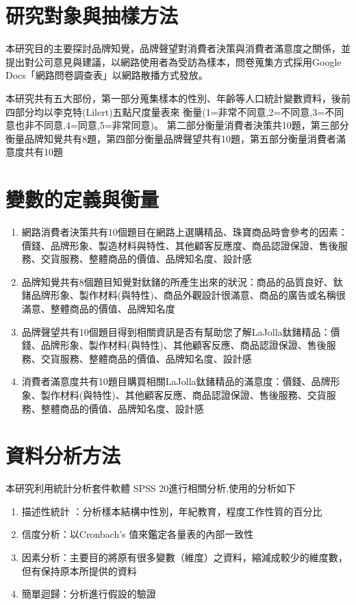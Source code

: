 \section{研究對象與抽樣方法}
本研究目的主要探討品牌知覺，品牌聲望對消費者決策與消費者滿意度之關係，並提出對公司意見與建議，以網路使用者為受訪為樣本，問卷蒐集方式採用Google Docs「網路問卷調查表」以網路散播方式發放。

本研究共有五大部份，第一部分蒐集樣本的性別、年齡等人口統計變數資料，後前四部分均以李克特(Lilert)五點尺度量表來 衡量(1=非常不同意,2=不同意,3=不同意也非不同意,4=同意,5=非常同意)。
第二部分衡量消費者決策共10題，第三部分衡量品牌知覺共有8題，第四部分衡量品牌聲望共有10題，第五部分衡量消費者滿意度共有10題

\section{變數的定義與衡量}
\begin{enumerate}
\item  網路消費者決策共有10個題目在網路上選購精品、珠寶商品時會參考的因素：價錢、品牌形象、製造材料與特性、其他顧客反應度、商品認證保證、售後服務、交貨服務、整體商品的價值、品牌知名度、設計感
\item 品牌知覺共有8個題目知覺對鈦鍺的所產生出來的狀況：商品的品質良好、鈦鍺品牌形象、製作材料(與特性)、商品外觀設計很滿意、商品的廣告或名稱很滿意、整體商品的價值、品牌知名度
\item 品牌聲望共有10個題目得到相關資訊是否有幫助您了解LaJolla鈦鍺精品：價錢、品牌形象、製作材料(與特性)、其他顧客反應、商品認證保證、售後服務、交貨服務、整體商品的價值、品牌知名度、設計感
\item 消費者滿意度共有10題目購買相關LaJolla鈦鍺精品的滿意度：價錢、品牌形象、製作材料(與特性)、其他顧客反應、商品認證保證、售後服務、交貨服務、整體商品的價值、品牌知名度、設計感
\end{enumerate}

\section{資料分析方法}
本研究利用統計分析套件軟體 SPSS 20進行相關分析,使用的分析如下
\begin{enumerate}
\item 描述性統計 ：分析樣本結構中性別，年紀教育，程度工作性質的百分比
\item 信度分析：以Cronbach's 值來鑑定各量表的內部一致性
\item 因素分析：主要目的將原有很多變數（維度）之資料，縮減成較少的維度數，但有保持原本所提供的資料
\item 簡單迴歸：分析進行假設的驗證
\end{enumerate}

